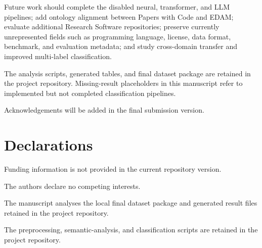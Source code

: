 \documentclass[pdflatex,sn-mathphys-num]{sn-jnl}%
\theoremstyle{thmstyleone}%
\theoremstyle{thmstyletwo}%
\theoremstyle{thmstylethree}%
\begin{document}
Future work should complete the disabled neural, transformer, and LLM pipelines; add ontology alignment between Papers with Code and EDAM; evaluate additional Research Software repositories; preserve currently unrepresented fields such as programming language, license, data format, benchmark, and evaluation metadata; and study cross-domain transfer and improved multi-label classification.

\backmatter

The analysis scripts, generated tables, and final dataset package are retained in the project repository. Missing-result placeholders in this manuscript refer to implemented but not completed classification pipelines.

Acknowledgements will be added in the final submission version.

\section*{Declarations}

Funding information is not provided in the current repository version.

The authors declare no competing interests.

The manuscript analyses the local final dataset package and generated result files retained in the project repository.

The preprocessing, semantic-analysis, and classification scripts are retained in the project repository.


\end{document}
